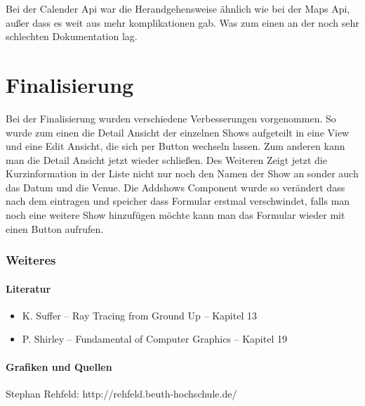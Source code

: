 \documentclass[12pt,titlepage]{article}
\begin{document}
Bei der Calender Api war die Herandgehensweise ähnlich wie bei der Maps Api, außer dass es weit aus mehr komplikationen gab. Was zum einen an der noch sehr schlechten Dokumentation lag.

\newpage
\part{Finalisierung}
Bei der Finalisierung wurden verschiedene Verbesserungen vorgenommen. So wurde zum einen die Detail Ansicht der einzelnen Shows aufgeteilt in eine View und eine Edit Ansicht, die sich per Button wechseln lassen. Zum anderen kann man die Detail Ansicht jetzt wieder schließen. Des Weiteren Zeigt jetzt die Kurzinformation in der Liste nicht nur noch den Namen der Show an sonder auch das Datum und die Venue. Die Addshows Component wurde so verändert dass nach dem eintragen und speicher dass Formular erstmal verschwindet, falls man noch eine weitere Show hinzufügen möchte kann man das Formular wieder mit einen Button aufrufen.

\newpage

\section{Weiteres}
\subsection{Literatur}
\begin{itemize}
\item K. Suffer – Ray Tracing from Ground Up – Kapitel 13
\item P. Shirley – Fundamental of Computer Graphics – Kapitel 19
\end{itemize}
\subsection{Grafiken und Quellen}
Stephan Rehfeld: http://rehfeld.beuth-hochschule.de/

 
   
\end{document}
